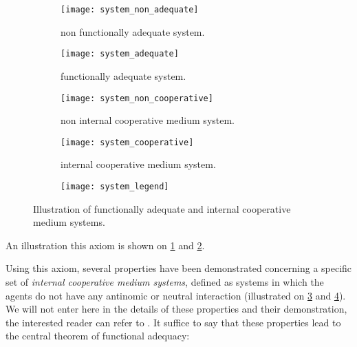 
\begin{figure}
\centering

	\begin{subfigure}[b]{0.45\textwidth}
		\centering
		\texttt{[image: system\_non\_adequate]}
		\caption{non functionally adequate system.}\label{adequacy_comp_1}
	\end{subfigure}
	\begin{subfigure}[b]{0.45\textwidth}
		\centering
		\texttt{[image: system\_adequate]}
		\caption{functionally adequate system.}\label{adequacy_comp_2}
	\end{subfigure}
	
	\begin{subfigure}[b]{0.45\textwidth}
		\centering
		\texttt{[image: system\_non\_cooperative]}
		\caption{non internal cooperative medium system.}\label{internal_cooperative_comp_1}
	\end{subfigure}
	\begin{subfigure}[b]{0.45\textwidth}
		\centering
		\texttt{[image: system\_cooperative]}
		\caption{internal cooperative medium system.}\label{internal_cooperative_comp_2}
	\end{subfigure}
	
	\begin{subfigure}[b]{0.7\textwidth}
		\centering
		\texttt{[image: system\_legend]}
	\end{subfigure}
	
\caption{Illustration of functionally adequate  and internal cooperative medium systems.}
\label{adequacy_comp}
\end{figure}

An illustration this axiom is shown on \figurename{} \ref{adequacy_comp_1} and  \figurename{} \ref{adequacy_comp_2}.



Using this axiom, several properties have been demonstrated concerning a specific set of \emph{internal cooperative medium systems}, defined as systems in which the agents do not have any antinomic or neutral interaction (illustrated on \figurename{} \ref{internal_cooperative_comp_1} and \figurename{} \ref{internal_cooperative_comp_2}). We will not enter here in the details of these properties and their demonstration, the interested reader can refer to \cite{glize2001adaptation, gleizes1999theory}. It suffice to say that these properties lead to the central theorem of functional adequacy:

